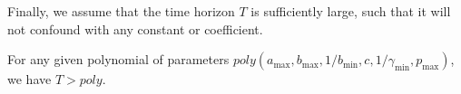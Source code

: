 Finally, we assume that the time horizon $T$ is sufficiently large, such that it will not confound with any constant or coefficient.

\begin{assumption}[Large $T$]
    \label{assumption:large_T}
    For any given polynomial of parameters $poly(a_{\max}, b_{\max}, 1/b_{\min}, c, 1/\gamma_{\min}, p_{\max})$, we have $T>poly$.
\end{assumption}

